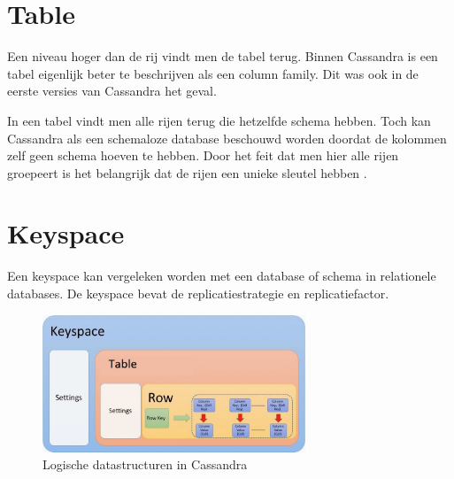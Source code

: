 \section{Table}
Een niveau hoger dan de rij vindt men de tabel terug.
Binnen Cassandra is een tabel eigenlijk beter te beschrijven als een column family.
Dit was ook in de eerste versies van Cassandra het geval.

In een tabel vindt men alle rijen terug die hetzelfde schema hebben.
Toch kan Cassandra als een schemaloze database beschouwd worden doordat de kolommen zelf geen schema hoeven te hebben.
Door het feit dat men hier alle rijen groepeert is het belangrijk dat de rijen een unieke sleutel hebben \citep{hewitt2010cassandra}.

\section{Keyspace}
\label{sec:keyspace}
Een keyspace kan vergeleken worden met een database of schema in relationele databases.
De keyspace bevat de replicatiestrategie en replicatiefactor.

\begin{figure}[H]
	\centering
	\includegraphics[width=0.7\textwidth]{img/4_data/data}
	\caption{Logische datastructuren in Cassandra}
	\label{fig:datastructure}
\end{figure}